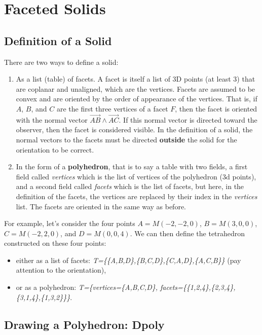 \section{Faceted Solids}

\subsection{Definition of a Solid}

There are two ways to define a solid:
\begin{enumerate}
    \item As a list (table) of facets. A facet is itself a list of 3D points (at least 3) that are coplanar and unaligned, which are the vertices. Facets are assumed to be convex and are oriented by the order of appearance of the vertices. That is, if $A$, $B$, and $C$ are the first three vertices of a facet $F$, then the facet is oriented with the normal vector $\vec{AB}\wedge\vec{AC}$. If this normal vector is directed toward the observer, then the facet is considered visible. In the definition of a solid, the normal vectors to the facets must be directed \textbf{outside} the solid for the orientation to be correct.

    \item In the form of a \textbf{polyhedron}, that is to say a table with two fields, a first field called \emph{vertices} which is the list of vertices of the polyhedron (3d points), and a second field called \emph{facets} which is the list of facets, but here, in the definition of the facets, the vertices are replaced by their index in the \emph{vertices} list. The facets are oriented in the same way as before. \end{enumerate}

For example, let's consider the four points $A=M(-2,-2,0)$, $B=M(3,0,0)$, $C=M(-2,2,0)$, and $D=M(0,0,4)$. We can then define the tetrahedron constructed on these four points:
\begin{itemize}
    \item either as a list of facets: \emph{T=\{\{A,B,D\},\{B,C,D\},\{C,A,D\},\{A,C,B\}\}} (pay attention to the orientation),
    \item or as a polyhedron:
\emph{T=\{vertices=\{A,B,C,D\}, facets=\{\{1,2,4\},\{2,3,4\},\{3,1,4\},\{1,3,2\}\}\}}.
\end{itemize}

\subsection{Drawing a Polyhedron: Dpoly}

